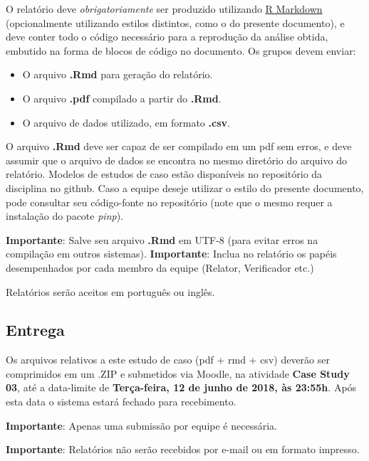 \documentclass[11pt,twoside,printwatermark=false]{pinp}
\providecommand{\tightlist}{%
  \setlength{\itemsep}{0pt}\setlength{\parskip}{0pt}}
\begin{document}
O relatório deve \emph{obrigatoriamente} ser produzido utilizando
\href{http://rmarkdown.rstudio.com}{R Markdown} (opcionalmente
utilizando estilos distintos, como o do presente documento), e deve
conter todo o código necessário para a reprodução da análise obtida,
embutido na forma de blocos de código no documento. Os grupos devem
enviar:

\begin{itemize}
\tightlist
\item
  O arquivo \textbf{.Rmd} para geração do relatório.
\item
  O arquivo \textbf{.pdf} compilado a partir do \textbf{.Rmd}.
\item
  O arquivo de dados utilizado, em formato \textbf{.csv}.
\end{itemize}

O arquivo \textbf{.Rmd} deve ser capaz de ser compilado em um pdf sem
erros, e deve assumir que o arquivo de dados se encontra no mesmo
diretório do arquivo do relatório. Modelos de estudos de caso estão
disponíveis no repositório da disciplina no github. Caso a equipe deseje
utilizar o estilo do presente documento, pode consultar seu código-fonte
no repositório (note que o mesmo requer a instalação do pacote
\emph{pinp}).

\textbf{Importante}: Salve seu arquivo \textbf{.Rmd} em UTF-8 (para
evitar erros na compilação em outros sistemas). \textbf{Importante}:
Inclua no relatório os papéis desempenhados por cada membro da equipe
(Relator, Verificador etc.)

Relatórios serão aceitos em português ou inglês.

\subsection{Entrega}\label{entrega}

Os arquivos relativos a este estudo de caso (pdf + rmd + csv) deverão
ser comprimidos em um .ZIP e submetidos via Moodle, na atividade
\textbf{Case Study 03}, até a data-limite de \textbf{Terça-feira, 12 de
junho de 2018, às 23:55h}. Após esta data o sistema estará fechado para
recebimento.

\textbf{Importante}: Apenas uma submissão por equipe é necessária.

\textbf{Importante}: Relatórios não serão recebidos por e-mail ou em
formato impresso.





\end{document}

